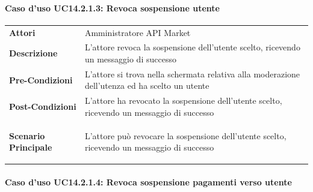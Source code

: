 \paragraph{Caso d'uso UC14.2.1.3: Revoca sospensione utente}
\label{UC14_2_1_3}

\begin{minipage}{\linewidth}
	\begin{tabular}{ l | p{11cm}}
		\hline
		\rowcolor{Gray}
		\multicolumn{2}{c}{UC14.2.1.3 - Revoca sospensione utente} \\
		\hline
		\textbf{Attori} & Amministratore API Market \\
		\textbf{Descrizione} & L'attore revoca la sospensione dell'utente scelto, ricevendo un messaggio di successo \\
		\textbf{Pre-Condizioni} & L'attore si trova nella schermata relativa alla moderazione dell'utenza ed ha scelto un utente \\
		\textbf{Post-Condizioni} & L'attore ha revocato la sospensione dell'utente scelto, ricevendo un messaggio di successo \\
		\textbf{Scenario Principale} & 
		\begin{enumerate*}[label=(\arabic*.),itemjoin={\newline}]
			\item L'attore può revocare la sospensione dell'utente scelto, ricevendo un messaggio di successo
		\end{enumerate*}\\
	\end{tabular}
\end{minipage}

\paragraph{Caso d'uso UC14.2.1.4: Revoca sospensione pagamenti verso utente}
\label{UC14_2_1_4}

